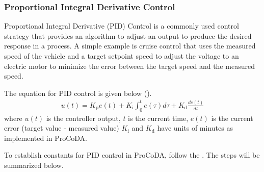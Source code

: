 \documentclass[letterpaper,10pt,english]{sphinxmanual}
\begin{document}
\subsubsection{Proportional Integral Derivative Control}
\label{\detokenize{ProCoDA/ProCoDA:proportional-integral-derivative-control}}\label{\detokenize{ProCoDA/ProCoDA:id6}}
Proportional Integral Derivative (PID) Control is a commonly used control strategy that provides an algorithm to adjust an output to produce the desired response in a process. A simple example is cruise control that uses the measured speed of the vehicle and a target setpoint speed to adjust the voltage to an electric motor to minimize the error between the target speed and the measured speed.

The equation for PID control is given below ().
\begin{equation}\label{equation:ProCoDA/ProCoDA:ProCoDA/ProCoDA:5}
\begin{split}u(t) = K_{\mathrm{p}} e(t) + K_{\mathrm{i}} \int_{0}^{t} e(\tau) d \tau + K_{\mathrm{d}} \frac{d e(t)}{d t}\end{split}
\end{equation}
where \(u(t)\) is the controller output, \(t\) is the current time, \(e(t)\) is the current error (target value - measured value) \(K_{\mathrm{i}}\) and \(K_{\mathrm{d}}\) have units of minutes as implemented in ProCoDA.

To establish constants for PID control in ProCoDA, follow the . The steps will be summarized below.
\end{document}
